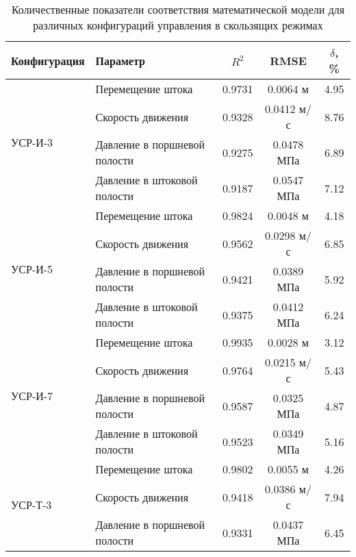 \begin{table}[h]
	\centering
	\caption{Количественные показатели соответствия математической модели для различных конфигураций управления в скользящих режимах}
	\small
	\label{tab:smc_validation}
	\begin{tabular}{llccc}
		\hline
		\textbf{Конфигурация}    & \textbf{Параметр}            & $R^2$        & RMSE             & $\delta$, \% \\
		\hline
		\multirow{4}{*}{УСР-И-3} & Перемещение штока            & \num{0.9731} & \num{0.0064} м   & \num{4.95}   \\
		                         & Скорость движения            & \num{0.9328} & \num{0.0412} м/с & \num{8.76}   \\
		                         & Давление в поршневой полости & \num{0.9275} & \num{0.0478} МПа & \num{6.89}   \\
		                         & Давление в штоковой полости  & \num{0.9187} & \num{0.0547} МПа & \num{7.12}   \\
		\hline
		\multirow{4}{*}{УСР-И-5} & Перемещение штока            & \num{0.9824} & \num{0.0048} м   & \num{4.18}   \\
		                         & Скорость движения            & \num{0.9562} & \num{0.0298} м/с & \num{6.85}   \\
		                         & Давление в поршневой полости & \num{0.9421} & \num{0.0389} МПа & \num{5.92}   \\
		                         & Давление в штоковой полости  & \num{0.9375} & \num{0.0412} МПа & \num{6.24}   \\
		\hline
		\multirow{4}{*}{УСР-И-7} & Перемещение штока            & \num{0.9935} & \num{0.0028} м   & \num{3.12}   \\
		                         & Скорость движения            & \num{0.9764} & \num{0.0215} м/с & \num{5.43}   \\
		                         & Давление в поршневой полости & \num{0.9587} & \num{0.0325} МПа & \num{4.87}   \\
		                         & Давление в штоковой полости  & \num{0.9523} & \num{0.0349} МПа & \num{5.16}   \\
		\hline
		\multirow{4}{*}{УСР-Т-3} & Перемещение штока            & \num{0.9802} & \num{0.0055} м   & \num{4.26}   \\
		                         & Скорость движения            & \num{0.9418} & \num{0.0386} м/с & \num{7.94}   \\
		                         & Давление в поршневой полости & \num{0.9331} & \num{0.0437} МПа & \num{6.45}   \\

\end{tabular}
\end{table}
